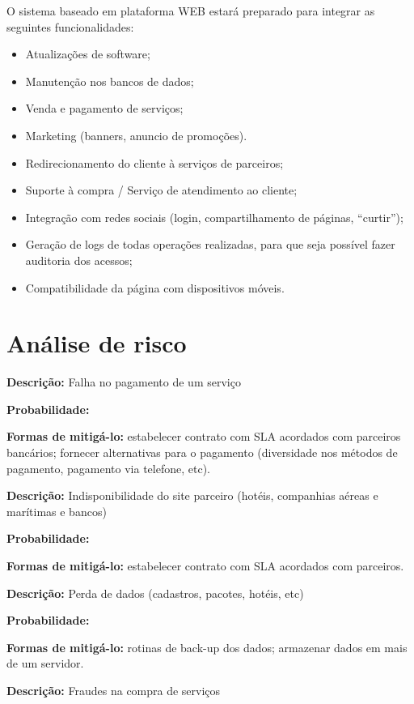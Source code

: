 \documentclass[12pt]{article}
\begin{document}
O sistema baseado em plataforma WEB estará preparado para integrar as seguintes funcionalidades:

\begin{itemize}
\item Atualizações de software;
\item Manutenção nos bancos de dados;
\item Venda e pagamento de serviços;
\item Marketing (banners, anuncio de promoções).
\item Redirecionamento do cliente à serviços de parceiros;
\item Suporte à compra / Serviço de atendimento ao cliente;
\item Integração com redes sociais (login, compartilhamento de páginas, “curtir”);
\item Geração de logs de todas operações realizadas, para que seja possível fazer auditoria dos acessos;
\item Compatibilidade da página com dispositivos móveis.

\end{itemize}

\clearpage
\section{Análise de risco}
\label{sec:risco}

{\bf Descrição:} Falha no pagamento de um serviço

{\bf Probabilidade:}

{\bf Formas de mitigá-lo:} estabelecer contrato com SLA acordados com parceiros bancários; fornecer alternativas para o pagamento (diversidade nos métodos de pagamento, pagamento via telefone, etc).


\bigskip
{\bf Descrição:} Indisponibilidade do site parceiro (hotéis, companhias aéreas e marítimas e bancos)

{\bf Probabilidade:}

{\bf Formas de mitigá-lo:} estabelecer contrato com SLA acordados com parceiros.


\bigskip
{\bf Descrição:} Perda de dados (cadastros, pacotes, hotéis, etc)

{\bf Probabilidade:}

{\bf Formas de mitigá-lo:} rotinas de back-up dos dados; armazenar dados em mais de um servidor.


\bigskip
{\bf Descrição:} Fraudes na compra de serviços
\end{document}
